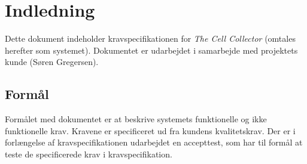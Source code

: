 \section{Indledning}
Dette dokument indeholder kravspecifikationen for \textit{The Cell Collector} (omtales herefter som systemet). Dokumentet er udarbejdet i samarbejde med projektets kunde (Søren Gregersen). 
\subsection{Formål}
Formålet med dokumentet er at beskrive systemets funktionelle og ikke funktionelle krav. Kravene er specificeret ud fra kundens kvalitetskrav. Der er i forlængelse af kravspecifikationen udarbejdet en accepttest, som har til formål at teste de specificerede krav i kravspecifikation.

